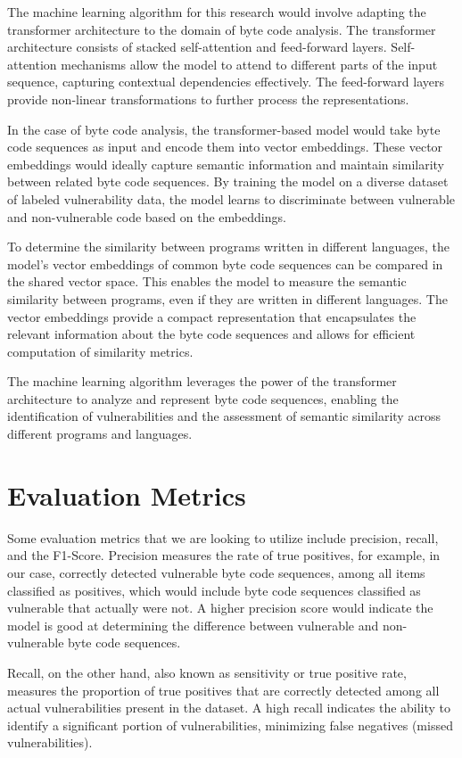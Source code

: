 \documentclass{article}
\begin{document}
The machine learning algorithm for this research would involve adapting the transformer architecture to the domain of byte code analysis. The transformer architecture consists of stacked self-attention and feed-forward layers. Self-attention mechanisms allow the model to attend to different parts of the input sequence, capturing contextual dependencies effectively. The feed-forward layers provide non-linear transformations to further process the representations.

In the case of byte code analysis, the transformer-based model would take byte code sequences as input and encode them into vector embeddings. These vector embeddings would ideally capture semantic information and maintain similarity between related byte code sequences. By training the model on a diverse dataset of labeled vulnerability data, the model learns to discriminate between vulnerable and non-vulnerable code based on the embeddings.

To determine the similarity between programs written in different languages, the model's vector embeddings of common byte code sequences can be compared in the shared vector space. This enables the model to measure the semantic similarity between programs, even if they are written in different languages. The vector embeddings provide a compact representation that encapsulates the relevant information about the byte code sequences and allows for efficient computation of similarity metrics.

The machine learning algorithm leverages the power of the transformer architecture to analyze and represent byte code sequences, enabling the identification of vulnerabilities and the assessment of semantic similarity across different programs and languages.

\section{Evaluation Metrics}
Some evaluation metrics that we are looking to utilize include precision, recall, and the F1-Score. Precision measures the rate of true positives, for example, in our case, correctly detected vulnerable byte code sequences, among all items classified as positives, which would include byte code sequences classified as vulnerable that actually were not. A higher precision score would indicate the model is good at determining the difference between vulnerable and non-vulnerable byte code sequences.

Recall, on the other hand, also known as sensitivity or true positive rate, measures the proportion of true positives that are correctly detected among all actual vulnerabilities present in the dataset. A high recall indicates the ability to identify a significant portion of vulnerabilities, minimizing false negatives (missed vulnerabilities).
\end{document}
